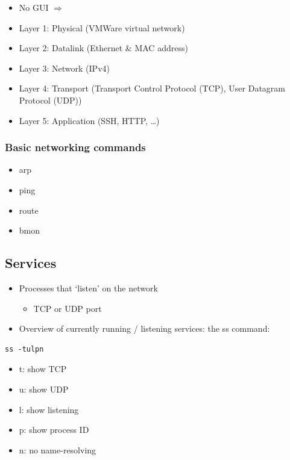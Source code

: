 \documentclass{article}
\begin{document}
\begin{itemize}
    \item No GUI $\Rightarrow$
    \item Layer 1: Physical (VMWare virtual network)
    \item Layer 2: Datalink (Ethernet \& MAC address)
    \item Layer 3: Network (IPv4)
    \item Layer 4: Transport (Transport Control Protocol (TCP), User Datagram Protocol (UDP))
    \item Layer 5: Application (SSH, HTTP, \dots)
\end{itemize}

\subsubsection{Basic networking commands}

\begin{itemize}
    \item arp
    \item ping
    \item route
    \item bmon
\end{itemize}

\subsection{Services}

\begin{itemize}
    \item Processes that `listen' on the network
    \begin{itemize}
        \item TCP or UDP port
    \end{itemize}
    \item Overview of currently running / listening services: the ss command:    
\end{itemize}

\begin{verbatim}
ss -tulpn
\end{verbatim}

\begin{itemize}
    \item t: show TCP
    \item u: show UDP
    \item l: show listening
    \item p: show process ID
    \item n: no name-resolving
\end{itemize} 
\end{document}
